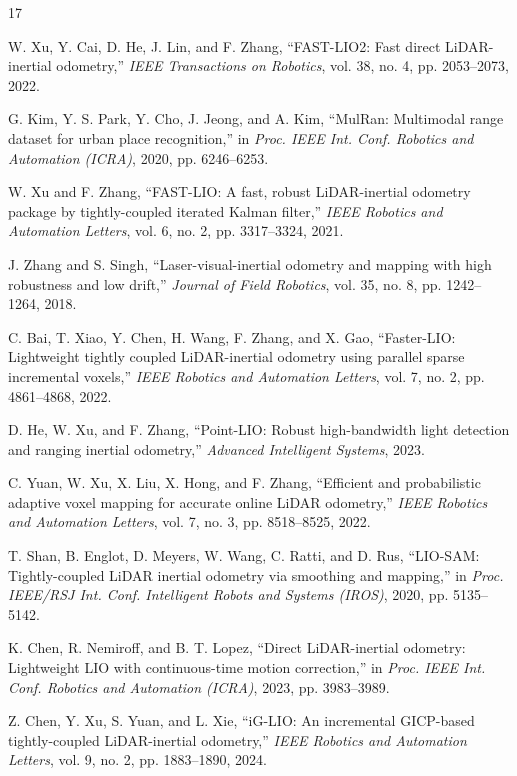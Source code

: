 \documentclass[conference]{IEEEtran}
\begin{document}
\begin{thebibliography}{17}

 W. Xu, Y. Cai, D. He, J. Lin, and F. Zhang, ``FAST-LIO2: Fast direct LiDAR-inertial odometry,'' \emph{IEEE Transactions on Robotics}, vol. 38, no. 4, pp. 2053--2073, 2022.

 G. Kim, Y. S. Park, Y. Cho, J. Jeong, and A. Kim, ``MulRan: Multimodal range dataset for urban place recognition,'' in \emph{Proc. IEEE Int. Conf. Robotics and Automation (ICRA)}, 2020, pp. 6246--6253.

 W. Xu and F. Zhang, ``FAST-LIO: A fast, robust LiDAR-inertial odometry package by tightly-coupled iterated Kalman filter,'' \emph{IEEE Robotics and Automation Letters}, vol. 6, no. 2, pp. 3317--3324, 2021.

 J. Zhang and S. Singh, ``Laser-visual-inertial odometry and mapping with high robustness and low drift,'' \emph{Journal of Field Robotics}, vol. 35, no. 8, pp. 1242--1264, 2018.

 C. Bai, T. Xiao, Y. Chen, H. Wang, F. Zhang, and X. Gao, ``Faster-LIO: Lightweight tightly coupled LiDAR-inertial odometry using parallel sparse incremental voxels,'' \emph{IEEE Robotics and Automation Letters}, vol. 7, no. 2, pp. 4861--4868, 2022.

 D. He, W. Xu, and F. Zhang, ``Point-LIO: Robust high-bandwidth light detection and ranging inertial odometry,'' \emph{Advanced Intelligent Systems}, 2023.

 C. Yuan, W. Xu, X. Liu, X. Hong, and F. Zhang, ``Efficient and probabilistic adaptive voxel mapping for accurate online LiDAR odometry,'' \emph{IEEE Robotics and Automation Letters}, vol. 7, no. 3, pp. 8518--8525, 2022.

 T. Shan, B. Englot, D. Meyers, W. Wang, C. Ratti, and D. Rus, ``LIO-SAM: Tightly-coupled LiDAR inertial odometry via smoothing and mapping,'' in \emph{Proc. IEEE/RSJ Int. Conf. Intelligent Robots and Systems (IROS)}, 2020, pp. 5135--5142.

 K. Chen, R. Nemiroff, and B. T. Lopez, ``Direct LiDAR-inertial odometry: Lightweight LIO with continuous-time motion correction,'' in \emph{Proc. IEEE Int. Conf. Robotics and Automation (ICRA)}, 2023, pp. 3983--3989.

 Z. Chen, Y. Xu, S. Yuan, and L. Xie, ``iG-LIO: An incremental GICP-based tightly-coupled LiDAR-inertial odometry,'' \emph{IEEE Robotics and Automation Letters}, vol. 9, no. 2, pp. 1883--1890, 2024.


\end{thebibliography}
\end{document}
